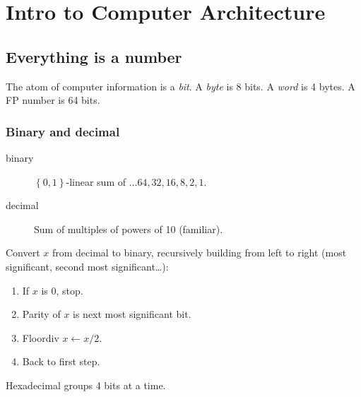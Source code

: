 \chapter{Intro to Computer Architecture	}
\section{Everything is a number}
The atom of computer information is a \emph{bit}.
A \emph{byte} is 8 bits.
A \emph{word} is 4 bytes.
A FP number is 64 bits.

\subsection{Binary and decimal}
\begin{description}
	\item[binary] \(\left\{0,1\right\}\)-linear sum of \(\ldots64, 32, 16, 8, 2, 1\).
	\item[decimal] Sum of multiples of powers of 10 (familiar).
\end{description}

Convert \(x\) from decimal to binary, recursively
building from left to right
(most significant, second most significant\ldots):
\begin{enumerate}
	\item If \(x\) is 0, stop.
	\item Parity of \(x\) is next most significant bit.
	\item Floordiv \(x \leftarrow x/2\).
	\item Back to first step.
\end{enumerate}

Hexadecimal groups 4 bits at a time.